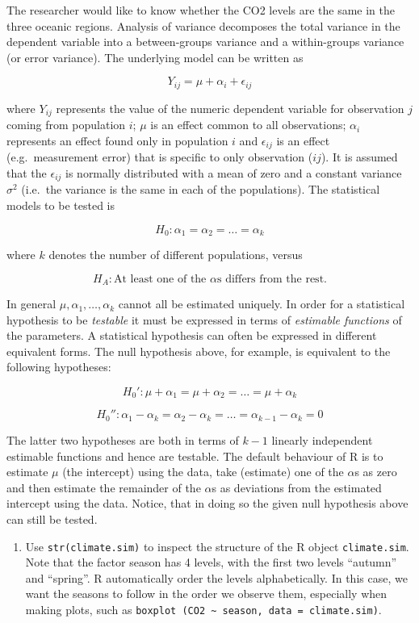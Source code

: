 \documentclass[
]{book}
\providecommand{\tightlist}{%
  \setlength{\itemsep}{0pt}\setlength{\parskip}{0pt}}
\begin{document}
The researcher would like to know whether the CO2 levels are the same in the three oceanic regions. Analysis of variance decomposes the total variance in the dependent variable into a between-groups variance and a within-groups variance (or error variance). The underlying model can be written as

\[
Y_{ij} = \mu + \alpha_i + \epsilon_{ij}
\]

where \(Y_{ij}\) represents the value of the numeric dependent variable for observation \(j\) coming from population \(i\); \(\mu\) is an effect common to all observations; \(\alpha_i\) represents an effect found only in population \(i\) and \(\epsilon_{ij}\) is an effect (e.g.~measurement error) that is specific to only observation (\(ij\)). It is assumed that the \(\epsilon_{ij}\) is normally distributed with a mean of zero and a constant variance \(\sigma^2\) (i.e.~the variance is the same in each of the populations). The statistical models to be tested is

\[
H_0: \alpha_1 = \alpha_2 = \dots = \alpha_k
\]

where \(k\) denotes the number of different populations, versus

\[
H_A: \text{At least one of the } \alpha \text{s differs from the rest}.
\]

In general \(\mu, \alpha_1, \dots, \alpha_k\) cannot all be estimated uniquely. In order for a statistical hypothesis to be \emph{{testable}} it must be expressed in terms of \emph{{estimable functions}} of the parameters. A statistical hypothesis can often be expressed in different equivalent forms. The null hypothesis above, for example, is equivalent to the following hypotheses:

\[
H_0': \mu+\alpha_1 = \mu+\alpha_2 = \dots = \mu+\alpha_k
\]

\[
H_0'': \alpha_1 - \alpha_k = \alpha_2 - \alpha_k = \dots = \alpha_{k-1} - \alpha_k = 0 
\]

The latter two hypotheses are both in terms of \(k - 1\) linearly independent estimable functions and hence are testable. The default behaviour of R is to estimate \(\mu\) (the intercept) using the data, take (estimate) one of the \(\alpha\)s as zero and then estimate the remainder of the \(\alpha\)s as deviations from the estimated intercept using the data. Notice, that in doing so the given null hypothesis above can still be tested.

\begin{enumerate}
\def\labelenumi{(\alph{enumi})}
\tightlist
\item
  Use \texttt{str(climate.sim)} to inspect the structure of the R object \texttt{climate.sim}. Note that the factor season has 4 levels, with the first two levels ``autumn'' and ``spring''. R automatically order the levels alphabetically. In this case, we want the seasons to follow in the order we observe them, especially when making plots, such as \texttt{boxplot\ (CO2\ \textasciitilde{}\ season,\ data\ =\ climate.sim)}.
\end{enumerate}
\end{document}
